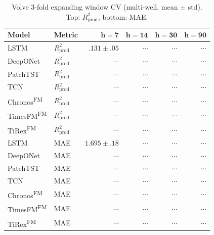 \documentclass[11pt]{article}
\newcommand{\fm}{\textsuperscript{FM}}
\newcommand{\rp}{R^2_\text{prod}}
\begin{document}
\begin{table}[ht]
\centering
\caption{Volve 3-fold expanding window CV (multi-well, mean $\pm$ std). Top: $\rp$, bottom: MAE.}
\label{tab:volve_cv}
\scriptsize
\setlength{\tabcolsep}{2.5pt}
\begin{tabular}{@{}ll rrrr @{}}
\toprule
\textbf{Model} & \textbf{Metric} & $\boldsymbol{h{=}7}$ & $\boldsymbol{h{=}14}$ & $\boldsymbol{h{=}30}$ & $\boldsymbol{h{=}90}$ \\
\midrule
LSTM          & $\rp$ & $.131 \pm .05$ & $\cdots$ & $\cdots$ & $\cdots$ \\
DeepONet      & $\rp$ & $\cdots$ & $\cdots$ & $\cdots$ & $\cdots$ \\
PatchTST      & $\rp$ & $\cdots$ & $\cdots$ & $\cdots$ & $\cdots$ \\
TCN           & $\rp$ & $\cdots$ & $\cdots$ & $\cdots$ & $\cdots$ \\
Chronos\fm    & $\rp$ & $\cdots$ & $\cdots$ & $\cdots$ & $\cdots$ \\
TimesFM\fm    & $\rp$ & $\cdots$ & $\cdots$ & $\cdots$ & $\cdots$ \\
TiRex\fm      & $\rp$ & $\cdots$ & $\cdots$ & $\cdots$ & $\cdots$ \\
\midrule
LSTM          & MAE & $1.695 \pm .18$ & $\cdots$ & $\cdots$ & $\cdots$ \\
DeepONet      & MAE & $\cdots$ & $\cdots$ & $\cdots$ & $\cdots$ \\
PatchTST      & MAE & $\cdots$ & $\cdots$ & $\cdots$ & $\cdots$ \\
TCN           & MAE & $\cdots$ & $\cdots$ & $\cdots$ & $\cdots$ \\
Chronos\fm    & MAE & $\cdots$ & $\cdots$ & $\cdots$ & $\cdots$ \\
TimesFM\fm    & MAE & $\cdots$ & $\cdots$ & $\cdots$ & $\cdots$ \\
TiRex\fm      & MAE & $\cdots$ & $\cdots$ & $\cdots$ & $\cdots$ \\
\bottomrule
\end{tabular}
\end{table}
\end{document}
